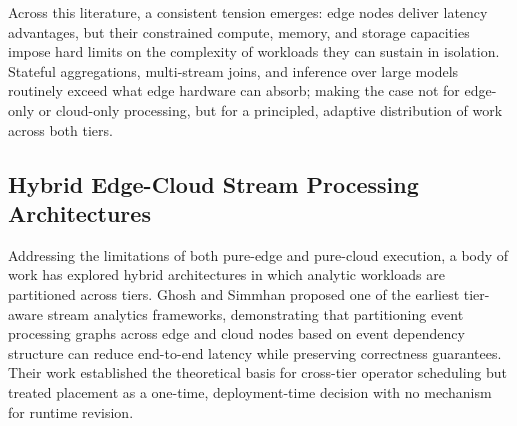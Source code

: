 \documentclass[preprint,review,12pt]{elsarticle}
\begin{document}
Across this literature, a consistent tension emerges: edge nodes deliver latency advantages, but their constrained compute, memory, and storage capacities impose hard limits on the complexity of workloads they can sustain in isolation. Stateful aggregations, multi-stream joins, and inference over large models routinely exceed what edge hardware can absorb; making the case not for edge-only or cloud-only processing, but for a principled, adaptive distribution of work across both tiers.

\subsection{Hybrid Edge-Cloud Stream Processing Architectures}\label{hybrid-edge-cloud-stream-processing-architectures}

Addressing the limitations of both pure-edge and pure-cloud execution, a body of work has explored hybrid architectures in which analytic workloads are partitioned across tiers. Ghosh and Simmhan \cite{ghosh2017scheduling} proposed one of the earliest tier-aware stream analytics frameworks, demonstrating that partitioning event processing graphs across edge and cloud nodes based on event dependency structure can reduce end-to-end latency while preserving correctness guarantees. Their work established the theoretical basis for cross-tier operator scheduling but treated placement as a one-time, deployment-time decision with no mechanism for runtime revision.
\end{document}
